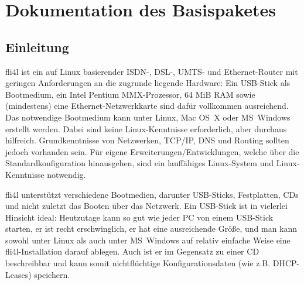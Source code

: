 \chapter{Dokumentation des Basispaketes}

\section{Einleitung}

fli4l ist ein auf Linux basierender ISDN-, DSL-, UMTS- und Ethernet-Router mit
geringen Anforderungen an die zugrunde liegende Hardware: Ein USB-Stick als
Bootmedium, ein Intel Pentium MMX-Prozessor, 64 MiB RAM sowie (mindestens) eine
Ethernet-Netzwerkkarte sind dafür vollkommen ausreichend. Das notwendige
Bootmedium kann unter Linux, Mac OS~X oder MS~Windows erstellt werden. Dabei sind keine
Linux-Kenntnisse erforderlich, aber durchaus hilfreich. Grundkenntnisse von
Netzwerken, TCP/IP, DNS und Routing sollten jedoch vorhanden sein. Für eigene
Erweiterungen/Entwicklungen, welche über die Standardkonfiguration hinausgehen,
sind ein lauffähiges Linux-System und Linux-Kenntnisse notwendig.

fli4l unterstützt verschiedene Bootmedien, darunter USB-Sticks, Festplatten,
CDs und nicht zuletzt das Booten über das Netzwerk. Ein USB-Stick ist in
vielerlei Hinsicht ideal: Heutzutage kann so gut wie jeder PC von einem
USB-Stick starten, er ist recht erschwinglich, er hat eine ausreichende Größe,
und man kann sowohl unter Linux als auch unter MS~Windows auf relativ einfache
Weise eine fli4l-Installation darauf ablegen. Auch ist er im Gegensatz zu einer
CD beschreibbar und kann somit nichtflüchtige Konfigurationsdaten (wie z.B.
DHCP-Leases) speichern.

